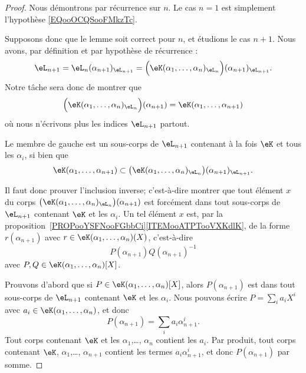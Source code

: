\begin{proof}
	Nous démontrons par récurrence sur \( n\). Le cas \( n=1\) est simplement l'hypothèse \eqref{EQooOCQSooFMkzTc}.

	Supposons donc que le lemme soit correct pour \( n\), et étudions le cas \( n+1\). Nous avons, par définition et par hypothèse de récurrence :
	\begin{equation}
		\eL_{n+1}=\eL_n(\alpha_{n+1})_{\eL_{n+1}}=\Big( \eK(\alpha_1,\ldots, \alpha_n)_{\eL_n} \Big)(\alpha_{n+1})_{\eL_{n+1}}.
	\end{equation}
	Notre tâche sera donc de montrer que
	\begin{equation}\label{EQooIHMGooTlPcsd}
		\Big( \eK(\alpha_1,\ldots, \alpha_n)_{\eL_n} \Big)(\alpha_{n+1})=\eK(\alpha_1,\ldots,\alpha_{n+1})
	\end{equation}
	où nous n'écrivons plus les indices \( \eL_{n+1}\) partout.

	Le membre de gauche est un sous-corps de \( \eL_{n+1}\) contenant à la fois \( \eK \) et tous les \(\alpha_i \), si bien que
	\begin{equation}\label{EQooLLRHooHOjLfk}
		\eK(\alpha_1,\ldots,\alpha_{n+1})\subset \big( \eK(\alpha_1,\ldots, \alpha_n)_{\eL_n} \big)(\alpha_{n+1})_{\eL_{n+1}}.
	\end{equation}

	Il faut donc prouver l'inclusion inverse; c'est-à-dire montrer que tout élément \( x \) du corps \( \big( \eK(\alpha_1,\ldots, \alpha_n)_{\eL_n} \big)(\alpha_{n+1})\) est forcément dans tout sous-corps de \( \eL_{n+1}\) contenant \( \eK\) et les \( \alpha_i\). Un tel élément \( x \) est, par la proposition~\ref{PROPooYSFNooFGbbCi}\ref{ITEMooATPTooVXKdlK}, de la forme \( r(\alpha_{n+1})\) avec \( r\in \eK(\alpha_1,\ldots, \alpha_{n})(X)\), c'est-à-dire
	\begin{equation}
		P(\alpha_{n+1})Q(\alpha_{n+1})^{-1}
	\end{equation}
	avec \( P,Q\in \eK(\alpha_1,\ldots, \alpha_n)[X]\).

	Prouvons d'abord que si \( P\in \eK(\alpha_1,\ldots, \alpha_n)[X]\), alors \( P(\alpha_{n+1})\) est dans tout sous-corps de \( \eL_{n+1}\) contenant \( \eK\) et les \( \alpha_i\). Nous pouvons écrire \( P=\sum_ia_iX^i\) avec \( a_i\in \eK(\alpha_1,\ldots, \alpha_n)\), et donc
	\begin{equation}
		P(\alpha_{n+1})=\sum_ia_i\alpha_{n+1}^i.
	\end{equation}
	Tout corps contenant \( \eK\) et les \( \alpha_1\),\ldots, \( \alpha_n\) contient les \( a_i\). Par produit, tout corps contenant \( \eK\), \( \alpha_1\),\ldots,  \( \alpha_{n+1}\) contient les termes \( a_i\alpha_{n+1}^i\), et donc \( P(\alpha_{n+1})\) par somme.


\end{proof}
